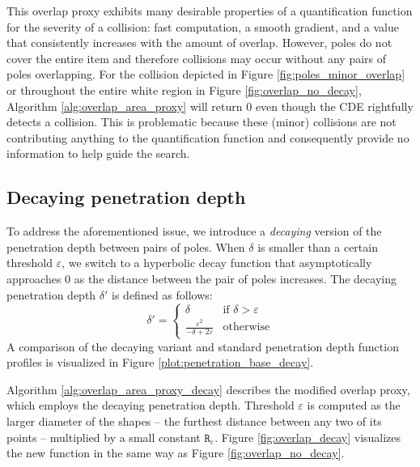 \documentclass[preprint, 11pt, authoryear]{elsarticle}
\begin{document}
This overlap proxy exhibits many desirable properties of a quantification function for the severity of a collision:
fast computation, a smooth gradient, and a value that consistently increases with the amount of overlap.
However, poles do not cover the entire item and therefore collisions may occur without any pairs of poles overlapping.
For the collision depicted in Figure \ref{fig:poles_minor_overlap} or throughout the entire white region in Figure \ref{fig:overlap_no_decay}, Algorithm \ref{alg:overlap_area_proxy} will return 0 even though the CDE rightfully detects a collision.
This is problematic because these (minor) collisions are not contributing anything to the quantification function and consequently provide no information to help guide the search.

\subsection{Decaying penetration depth}
To address the aforementioned issue, we introduce a \emph{decaying} version of the penetration depth between pairs of poles.
When $\delta$ is smaller than a certain threshold $\varepsilon$, we switch to a hyperbolic decay function that asymptotically approaches 0 as the distance between the pair of poles increases.
The decaying penetration depth $\delta'$ is defined as follows:
\begin{equation}
    \delta' = \begin{cases}
        \delta & \text{if } \delta > \varepsilon \\
        \frac{\varepsilon^2}{-\delta + 2\varepsilon} & \text{otherwise}
    \end{cases}
    \label{eq:pd_decay}
\end{equation}
A comparison of the decaying variant and standard penetration depth function profiles is visualized in Figure \ref{plot:penetration_base_decay}.







Algorithm \ref{alg:overlap_area_proxy_decay} describes the modified overlap proxy, which employs the decaying penetration depth.
Threshold $\varepsilon$ is computed as the larger diameter of the shapes -- the furthest distance between any two of its points -- multiplied by a small constant $\texttt{R}_\varepsilon$.
Figure \ref{fig:overlap_decay} visualizes the new function in the same way as Figure \ref{fig:overlap_no_decay}.
\end{document}
